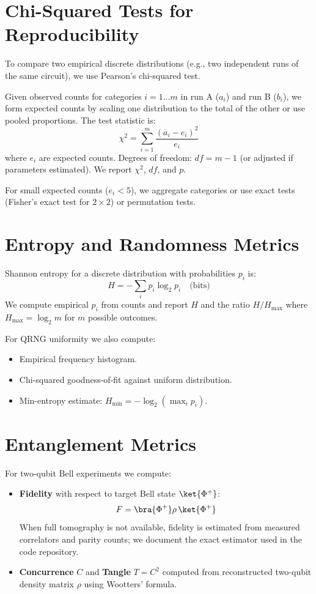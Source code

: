 \documentclass[11pt]{article}
\begin{document}
\section{Chi-Squared Tests for Reproducibility}
To compare two empirical discrete distributions (e.g., two independent runs of the same circuit), we use Pearson's chi-squared test.

Given observed counts for categories $i=1\ldots m$ in run A ($a_i$) and run B ($b_i$), we form expected counts by scaling one distribution to the total of the other or use pooled proportions. The test statistic is:
\[
\chi^2 = \sum_{i=1}^m \frac{(a_i - e_i)^2}{e_i}
\]
where $e_i$ are expected counts. Degrees of freedom: $df = m-1$ (or adjusted if parameters estimated). We report $\chi^2$, $df$, and $p$.

For small expected counts ($e_i < 5$), we aggregate categories or use exact tests (Fisher's exact test for $2\times2$) or permutation tests.

\section{Entropy and Randomness Metrics}
Shannon entropy for a discrete distribution with probabilities $p_i$ is:
\[
H = -\sum_{i} p_i \log_2 p_i \quad \text{(bits)}
\]
We compute empirical $p_i$ from counts and report $H$ and the ratio $H/H_{\max}$ where $H_{\max}=\log_2 m$ for $m$ possible outcomes.

For QRNG uniformity we also compute:
\begin{itemize}
  \item Empirical frequency histogram.
  \item Chi-squared goodness-of-fit against uniform distribution.
  \item Min-entropy estimate: $H_{\min} = -\log_2(\max_i p_i)$.
\end{itemize}

\section{Entanglement Metrics}
For two-qubit Bell experiments we compute:
\begin{itemize}
  \item \textbf{Fidelity} with respect to target Bell state $\ket{\Phi^+}$:
  \[
  F = \bra{\Phi^+}\rho\,\ket{\Phi^+}
  \]
  When full tomography is not available, fidelity is estimated from measured correlators and parity counts; we document the exact estimator used in the code repository.
  \item \textbf{Concurrence} $C$ and \textbf{Tangle} $T=C^2$ computed from reconstructed two-qubit density matrix $\rho$ using Wootters' formula.
\end{itemize}
\end{document}
